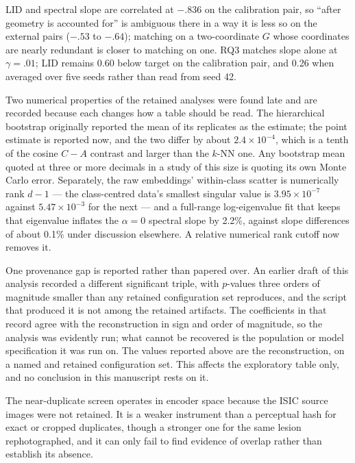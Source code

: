 \documentclass[11pt,a4paper]{article}
\begin{document}
LID and spectral slope are correlated at $-.836$ on the calibration pair, so ``after geometry is accounted for'' is ambiguous there in a way it is less so on the external pairs ($-.53$ to $-.64$); matching on a two-coordinate $G$ whose coordinates are nearly redundant is closer to matching on one. RQ3 matches slope alone at $\gamma=.01$; LID remains 0.60 below target on the calibration pair, and 0.26 when averaged over five seeds rather than read from seed 42.

Two numerical properties of the retained analyses were found late and are
recorded because each changes how a table should be read. The hierarchical
bootstrap originally reported the mean of its replicates as the estimate; the
point estimate is reported now, and the two differ by about $2.4\times10^{-4}$,
which is a tenth of the cosine $C-A$ contrast and larger than the $k$-NN one.
Any bootstrap mean quoted at three or more decimals in a study of this size is
quoting its own Monte Carlo error. Separately, the raw embeddings' within-class
scatter is numerically rank $d-1$ --- the class-centred data's smallest singular
value is $3.95\times10^{-7}$ against $5.47\times10^{-3}$ for the next --- and a
full-range log-eigenvalue fit that keeps that eigenvalue inflates the
$\alpha=0$ spectral slope by 2.2\%, against slope differences of about 0.1\%
under discussion elsewhere. A relative numerical rank cutoff now removes it.

One provenance gap is reported rather than papered over. An earlier draft of this analysis recorded a different significant triple, with $p$-values three orders of magnitude smaller than any retained configuration set reproduces, and the script that produced it is not among the retained artifacts. The coefficients in that record agree with the reconstruction in sign and order of magnitude, so the analysis was evidently run; what cannot be recovered is the population or model specification it was run on. The values reported above are the reconstruction, on a named and retained configuration set. This affects the exploratory table only, and no conclusion in this manuscript rests on it.

The near-duplicate screen operates in encoder space because the ISIC source images were not retained. It is a weaker instrument than a perceptual hash for exact or cropped duplicates, though a stronger one for the same lesion rephotographed, and it can only fail to find evidence of overlap rather than establish its absence.
\end{document}
